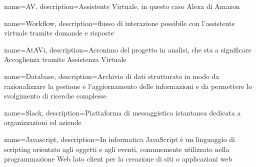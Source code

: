 {
  name=AV,
  description={Assistente Virtuale, in questo caso Alexa di Amazon}
}

{
  name=Workflow,
  description={flusso di interazione possibile con l'assistente virtuale tramite domande e risposte}
}

{
  name=AtAVi,
  description={Acronimo del progetto in analisi, che sta a significare Accoglienza tramite Assistenza Virtuale}
}

{
  name=Database,
  description={Archivio di dati strutturato in modo da razionalizzare la gestione e l’aggiornamento delle informazioni e da permettere lo svolgimento di ricerche complesse}
}

{
  name=Slack,
  description={Piattaforma di messaggistica istantanea dedicata a organizzazioni ed aziende}
}

{
  name=Javascript,
  description={In informatica JavaScript è un linguaggio di scripting orientato agli oggetti e agli eventi, comunemente utilizzato nella programmazione Web lato client per la creazione di siti o applicazioni web}
}

